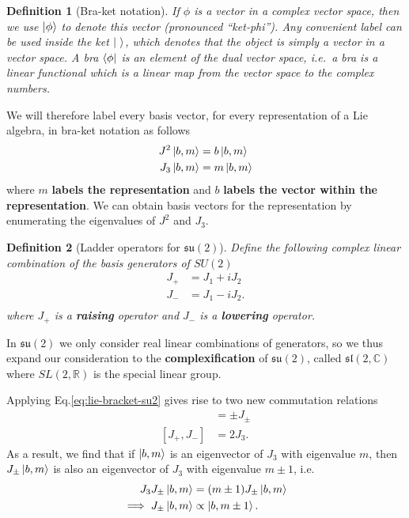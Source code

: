 \documentclass[11pt]{article}
\numberwithin{equation}{section}
\newtheorem{defn}{Definition}[section]
\begin{document}
\begin{defn}[Bra-ket notation] 
If $\phi$ is a vector in a complex vector space, then we use $\ket{\phi}$ to denote this vector (pronounced ``ket-phi''). Any convenient label can be used inside the ket $\ket{\ }$, which denotes that the object is simply a vector in a vector space. A bra $\bra{\phi}$ is an element of the dual vector space, i.e.\ a bra is a linear functional which is a linear map from the vector space to the complex numbers. 
\end{defn}

We will therefore label every basis vector, for every representation of a Lie algebra, in bra-ket notation as follows
\begin{align}
J^2 \ket{b, m} &= b \ket{b, m} \nonumber \\
J_3 \ket{b, m} &= m \ket{b, m}
\end{align}
where $m$ \textbf{labels the representation} and $b$ \textbf{labels the vector within the representation}. We can obtain basis vectors for the representation by enumerating the eigenvalues of $J^2$ and $J_3$. 

\begin{defn}[Ladder operators for $\mathfrak{su}(2)$]
Define the following complex linear combination of the basis generators of $SU(2)$
\begin{align}
J_+ &= J_1 + i J_2 \\
J_- &= J_1 - i J_2. \\
\end{align}
where $J_+$ is a \textbf{raising} operator and $J_-$ is a \textbf{lowering} operator.
\end{defn}
In $\mathfrak{su(2)}$ we only consider real linear combinations of generators, so we thus expand our consideration to the \textbf{complexification} of $\mathfrak{su}(2)$, called $\mathfrak{sl}(2, \mathbb{C})$ where $SL(2,\mathbb{R})$ is the special linear group.

Applying Eq.\eqref{eq:lie-bracket-su2} gives rise to two new commutation relations
\begin{align}
[J_3, J_{\pm}] &= \pm J_{\pm} \\
[J_+, J_-] &= 2 J_3.
\end{align}
As a result, we find that if $\ket{b,m}$ is an eigenvector of $J_3$ with eigenvalue $m$, then $J_{\pm}\ket{b,m}$ is also an eigenvector of $J_3$ with eigenvalue $m \pm 1$, i.e.
\begin{align}
J_3 J_{\pm}\ket{b,m} &= (m \pm 1) J_{\pm}\ket{b,m} \\
\implies J_{\pm}\ket{b,m} &\propto \ket{b,m \pm 1}. \label{eq:ladder_propto_m_pm_1}
\end{align}
\end{document}
